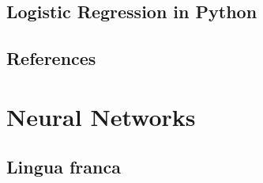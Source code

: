 \documentclass[4apaper,12pt]{book}
\begin{document}
\section{Logistic Regression in Python}
\begin{description}
  \item
\end{description}

\section{References}
\begin{description}
  \item
\end{description}

\chapter{Neural Networks}
\section {Lingua franca}
\end{document}
